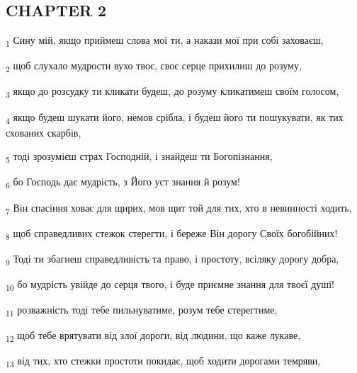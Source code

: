 \subsection{CHAPTER 2}
\begin{tcolorbox}
\textsubscript{1} Сину мій, якщо приймеш слова мої ти, а накази мої при собі заховаєш,
\end{tcolorbox}
\begin{tcolorbox}
\textsubscript{2} щоб слухало мудрости вухо твоє, своє серце прихилиш до розуму,
\end{tcolorbox}
\begin{tcolorbox}
\textsubscript{3} якщо до розсудку ти кликати будеш, до розуму кликатимеш своїм голосом,
\end{tcolorbox}
\begin{tcolorbox}
\textsubscript{4} якщо будеш шукати його, немов срібла, і будеш його ти пошукувати, як тих схованих скарбів,
\end{tcolorbox}
\begin{tcolorbox}
\textsubscript{5} тоді зрозумієш страх Господній, і знайдеш ти Богопізнання,
\end{tcolorbox}
\begin{tcolorbox}
\textsubscript{6} бо Господь дає мудрість, з Його уст знання й розум!
\end{tcolorbox}
\begin{tcolorbox}
\textsubscript{7} Він спасіння ховає для щирих, мов щит той для тих, хто в невинності ходить,
\end{tcolorbox}
\begin{tcolorbox}
\textsubscript{8} щоб справедливих стежок стерегти, і береже Він дорогу Своїх богобійних!
\end{tcolorbox}
\begin{tcolorbox}
\textsubscript{9} Тоді ти збагнеш справедливість та право, і простоту, всіляку дорогу добра,
\end{tcolorbox}
\begin{tcolorbox}
\textsubscript{10} бо мудрість увійде до серця твого, і буде приємне знання для твоєї душі!
\end{tcolorbox}
\begin{tcolorbox}
\textsubscript{11} розважність тоді тебе пильнуватиме, розум тебе стерегтиме,
\end{tcolorbox}
\begin{tcolorbox}
\textsubscript{12} щоб тебе врятувати від злої дороги, від людини, що каже лукаве,
\end{tcolorbox}
\begin{tcolorbox}
\textsubscript{13} від тих, хто стежки простоти покидає, щоб ходити дорогами темряви,
\end{tcolorbox}

